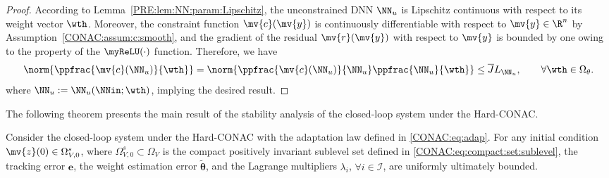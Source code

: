 \begin{proof}

  According to Lemma~\ref{PRE:lem:NN:param:Lipschitz}, the unconstrained DNN $\NN_u$ is Lipschitz continuous with respect to its weight vector $\wth$.
  Moreover, the constraint function $\mv{c}(\mv{y})$ is continuously differentiable with respect to $\mv{y}\in\R^n$ by Assumption~\ref{CONAC:assum:c:smooth}, and the gradient of the residual $\mv{r}(\mv{y})$ with respect to $\mv{y}$ is bounded by one owing to the property of the $\myReLU(\cdot)$ function.
  Therefore, we have
  \begin{equation}
    \norm{
      \ppfrac{\mv{c}(\NN_u)}{\wth}
    }
    =
    \norm{
      \ppfrac{\mv{c}(\NN_u)}{\NN_u}
      \ppfrac{\NN_u}{\wth}
    }
    \le
    \overline{J}
    L_{\NN_u}
    ,
    \qquad
    \forall \wth\in\Omega_{\theta}
    .
  \end{equation}
  where $\NN_u:=\NN_u(\NNin;\wth)$, implying the desired result.
\end{proof}

The following theorem presents the main result of the stability analysis of the closed-loop system under the Hard-CONAC.

\begin{theorem}
  \label{CONAC:thm:stability}
  Consider the closed-loop system under the Hard-CONAC with the adaptation law defined in \eqref{CONAC:eq:adap}. 
  For any initial condition $\mv{z}(0)\in\Omega_{V,0}^s$, where $\Omega_{V,0}^s\subset\Omega_V$ is the compact positively invariant sublevel set defined in \eqref{CONAC:eq:compact:set:sublevel}, the tracking error $\boldsymbol{e}$, the weight estimation error $\widetilde{\boldsymbol{\theta}}$, and the Lagrange multipliers $\lambda_i$, $\forall i\in\mathcal{I}$, are uniformly ultimately bounded. 
\end{theorem}

